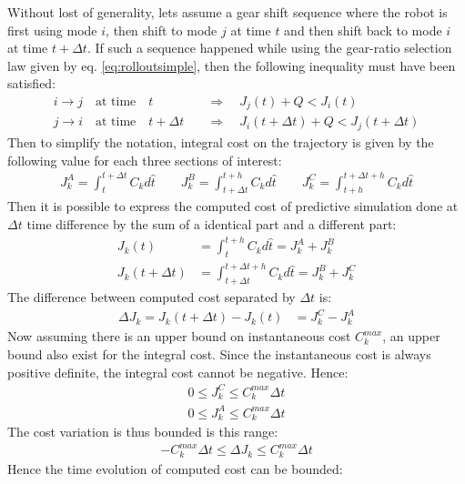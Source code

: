 Without lost of generality, lets assume a gear shift sequence where the robot is first using mode $i$, then shift to mode $j$ at time $t$ and then shift back to mode $i$ at time $t+\Delta t$. If such a sequence happened while using the gear-ratio selection law given by eq. \eqref{eq:rolloutsimple}, then the following inequality must have been satisfied:
%
\begin{align}
i \rightarrow j  \quad\text{at time}\quad t          &\quad\Rightarrow\quad J_j(t) + Q < J_i(t)                  \\
j \rightarrow i  \quad\text{at time}\quad t+\Delta t &\quad\Rightarrow\quad J_i(t+\Delta t) + Q < J_j(t+\Delta t)
\end{align}
%
Then to simplify the notation, integral cost on the trajectory is given by the following value for each three sections of interest:
%
\begin{align}
J_k^A = \int_{t}^{t+\Delta t}{         C_k  d\hat{t}  }   \quad \quad
J_k^B = \int_{t+\Delta t}^{t+h}{       C_k  d\hat{t}  }   \quad \quad
J_k^C = \int_{t+h}^{t+\Delta t+h}{     C_k  d\hat{t}  }
\end{align}
%
Then it is possible to express the computed cost of predictive simulation done at $\Delta t$ time difference by the sum of a identical part and a different part:
%
\begin{align}
J_k(t)          &= \int_{t}^{t+h}{ C_k   d\hat{t} }  = J_k^A + J_k^B \\
J_k(t+\Delta t) &= \int_{t+\Delta t}^{t+\Delta t+h}{   C_k  d\hat{t}} = J_k^B + J_k^C
\end{align}
%
The difference between computed cost separated by $\Delta t$ is:
%
\begin{align}
\Delta J_k = J_k(t+\Delta t) - J_k(t) &= J_k^C - J_k^A
\end{align}
%
Now assuming there is an upper bound on instantaneous cost $C_k^{max}$, an upper bound also exist for the integral cost. Since the instantaneous cost is always positive definite, the integral cost cannot be negative. Hence:
%
\begin{align}
0 \leq J_k^C   \leq  C_k^{max} \Delta t \\
0 \leq J_k^A   \leq  C_k^{max} \Delta t 
\end{align}
%
The cost variation is thus bounded is this range:
%
\begin{align}
-C_k^{max} \Delta t  \leq \Delta J_k \leq C_k^{max} \Delta t
\label{eq:costvariation}
\end{align}
%
Hence the time evolution of computed cost can be bounded:
